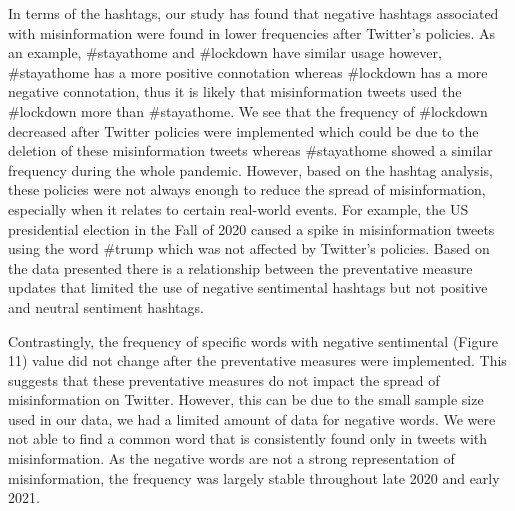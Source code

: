 \documentclass[10pt,twocolumn,letterpaper]{article}
\begin{document}
In terms of the hashtags, our study has found that negative hashtags associated with misinformation were found in lower frequencies after Twitter’s policies. As an example, \#stayathome and #lockdown have similar usage however, \#stayathome has a more positive connotation whereas #lockdown has a more negative connotation, thus it is likely that misinformation tweets used the \#lockdown more than \#stayathome. We see that the frequency of #lockdown decreased after Twitter policies were implemented which could be due to the deletion of these misinformation tweets whereas \#stayathome showed a similar frequency during the whole pandemic. However, based on the hashtag analysis, these policies were not always enough to reduce the spread of misinformation, especially when it relates to certain real-world events. For example, the US presidential election in the Fall of 2020 caused a spike in misinformation tweets using the word #trump which was not affected by Twitter’s policies. Based on the data presented there is a relationship between the preventative measure updates that limited the use of negative sentimental hashtags but not positive and neutral sentiment hashtags.

Contrastingly, the frequency of specific words with negative sentimental (Figure 11) value did not change after the preventative measures were implemented. This suggests that these preventative measures do not impact the spread of misinformation on Twitter. However, this can be due to the small sample size used in our data, we had a limited amount of data for negative words. We were not able to find a common word that is consistently found only in tweets with misinformation. As the negative words are not a strong representation of misinformation, the frequency was largely stable throughout late 2020 and early 2021.
\end{document}
